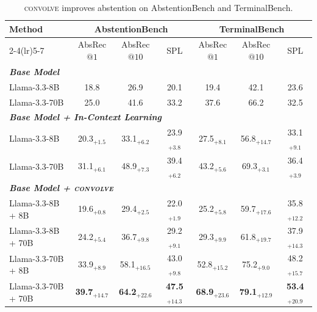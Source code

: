 \documentclass{llmxive}
\providecommand{\method}{\textsc{convolve}\xspace}
\begin{document}
\begin{table}[!t]
\vspace{0.8em}
\centering
\footnotesize
\vspace{-0.5em}
\label{tab:additional_context_evolving}
\setlength\tabcolsep{3.0pt}
\fontsize{7.8pt}{9.2pt}\selectfont
\begin{tabular}{p{2.55cm}ccc ccc}
\toprule
\multirow{2}{*}{\textbf{Method}}
& \multicolumn{3}{c}{\textbf{AbstentionBench}}
& \multicolumn{3}{c}{\textbf{TerminalBench}} \\
\cmidrule(lr){2-4}\cmidrule(lr){5-7}
& AbsRec$@1$ & AbsRec$@10$ & SPL
& AbsRec$@1$ & AbsRec$@10$ & SPL \\
\midrule

\multicolumn{7}{l}{\textit{\textbf{Base Model}}} \\
Llama-3.3-8B
& 18.8 & 26.9 & 20.1
& 19.4 & 42.1 & 23.6 \\
Llama-3.3-70B
& 25.0 & 41.6 & 33.2
& 37.6 & 66.2 & 32.5 \\

\midrule
\multicolumn{7}{l}{\textit{\textbf{Base Model + In-Context Learning}}} \\
Llama-3.3-8B
& 20.3$_{\text{+1.5}}$  
& 33.1$_{\text{+6.2}}$
& 23.9$_{\text{+3.8}}$
& 27.5$_{\text{+8.1}}$ 
& 56.8$_{\text{+14.7}}$ 
& 33.1$_{\text{+9.1}}$  \\
Llama-3.3-70B
& 31.1$_{\text{+6.1}}$  
& 48.9$_{\text{+7.3}}$
& 39.4$_{\text{+6.2}}$
& 43.2$_{\text{+5.6}}$ 
& 69.3$_{\text{+3.1}}$ 
& 36.4$_{\text{+3.9}}$  \\

\midrule
\multicolumn{7}{l}{\textit{\textbf{Base Model + \method}}} \\
Llama-3.3-8B + 8B
& 19.6$_{\text{+0.8}}$ 
& 29.4$_{\text{+2.5}}$ 
& 22.0$_{\text{+1.9}}$ 
& 25.2$_{\text{+5.8}}$ 
& 59.7$_{\text{+17.6}}$ 
& 35.8$_{\text{+12.2}}$  \\
Llama-3.3-8B + 70B
& 24.2$_{\text{+5.4}}$  
& 36.7$_{\text{+9.8}}$ 
& 29.2$_{\text{+9.1}}$ 
& 29.3$_{\text{+9.9}}$ 
& 61.8$_{\text{+19.7}}$ 
& 37.9$_{\text{+14.3}}$ \\

\rowcolor[RGB]{236,244,252}
Llama-3.3-70B + 8B
& 33.9$_{\text{+8.9}}$ 
& 58.1$_{\text{+16.5}}$ 
& 43.0$_{\text{+9.8}}$ 
& 52.8$_{\text{+15.2}}$
& 75.2$_{\text{+9.0}}$
& 48.2$_{\text{+15.7}}$ \\

\rowcolor[RGB]{236,244,252}
Llama-3.3-70B + 70B
& \textbf{39.7}$_{\text{+14.7}}$
& \textbf{64.2}$_{\text{+22.6}}$
& \textbf{47.5}$_{\text{+14.3}}$
& \textbf{68.9}$_{\text{+23.6}}$ 
& \textbf{79.1}$_{\text{+12.9}}$  
& \textbf{53.4}$_{\text{+20.9}}$  \\

\bottomrule
\end{tabular}
\vspace{-1em}
\caption{\method improves abstention on AbstentionBench and TerminalBench.}
\end{table}
\end{document}
